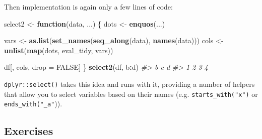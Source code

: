 \documentclass[]{book}
\newenvironment{Shaded}{\begin{snugshade}}{\end{snugshade}}
\newcommand{\CommentTok}[1]{\textcolor[rgb]{0.37,0.37,0.37}{\textit{#1}}}
\newcommand{\ControlFlowTok}[1]{\textcolor[rgb]{0.27,0.27,0.27}{\textbf{#1}}}
\newcommand{\KeywordTok}[1]{\textcolor[rgb]{0.27,0.27,0.27}{\textbf{#1}}}
\newcommand{\NormalTok}[1]{#1}
\newcommand{\OperatorTok}[1]{\textcolor[rgb]{0.43,0.43,0.43}{\textbf{#1}}}
\newcommand{\OtherTok}[1]{\textcolor[rgb]{0.37,0.37,0.37}{#1}}
\newcommand{\StringTok}[1]{\textcolor[rgb]{0.5,0.5,0.5}{#1}}
\begin{document}
Then implementation is again only a few lines of code:

\begin{Shaded}
\begin{Highlighting}[]
\NormalTok{select2 <-}\StringTok{ }\ControlFlowTok{function}\NormalTok{(data, ...) \{}
\NormalTok{  dots <-}\StringTok{ }\KeywordTok{enquos}\NormalTok{(...)}

\NormalTok{  vars <-}\StringTok{ }\KeywordTok{as.list}\NormalTok{(}\KeywordTok{set_names}\NormalTok{(}\KeywordTok{seq_along}\NormalTok{(data), }\KeywordTok{names}\NormalTok{(data)))}
\NormalTok{  cols <-}\StringTok{ }\KeywordTok{unlist}\NormalTok{(}\KeywordTok{map}\NormalTok{(dots, eval_tidy, vars))}

\NormalTok{  df[, cols, drop =}\StringTok{ }\OtherTok{FALSE}\NormalTok{]}
\NormalTok{\}}
\KeywordTok{select2}\NormalTok{(df, b}\OperatorTok{:}\NormalTok{d)}
\CommentTok{#>   b c d}
\CommentTok{#> 1 2 3 4}
\end{Highlighting}
\end{Shaded}

\texttt{dplyr::select()} takes this idea and runs with it, providing a number of helpers that allow you to select variables based on their names (e.g. \texttt{starts\_with("x")} or \texttt{ends\_with("\_a"})).

\hypertarget{exercises-11}{%
\subsection{Exercises}\label{exercises-11}}
\end{document}

